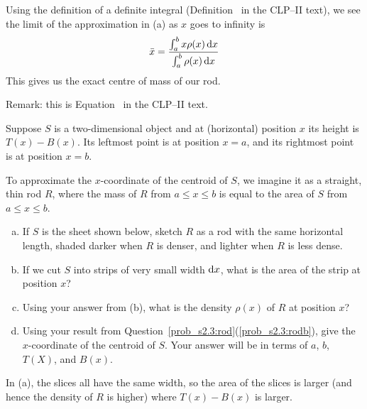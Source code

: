 \begin{solution}
\begin{enumerate}[(a)]
Using the definition of a definite integral (Definition~ in the CLP--II text), we see the limit of the approximation in (a) as $x$ goes to infinity is
\[\bar x=\frac{\int_a^b x\rho(x)\,\mathrm{d}x}{\int_a^b\rho(x)\,\mathrm{d}x}\]
This gives us the exact centre of mass of our rod.

Remark: this is Equation~ in the CLP--II text.
\end{enumerate}
\end{solution}
\begin{question}\label{prob_s2.3:xbar}
Suppose  $S$ is a two-dimensional object
and at (horizontal) position $x$  its height is $T(x)-B(x)$. Its leftmost point is at position $x=a$, and its rightmost point is at position $x=b$.

To approximate the $x$-coordinate of the centroid of $S$, we imagine it as a straight, thin rod $R$, where the mass of $R$ from $a \le x \le b$ is equal to the area of $S$ from $a \leq x \leq b$.
\begin{enumerate}[(a)]
\item If $S$ is the sheet shown below, sketch $R$ as a rod with the same horizontal length, shaded darker when $R$ is denser, and lighter when $R$ is less dense.
\begin{center}
\end{center}
\item If we cut $S$ into strips of very small width $\mathrm{d}x$, what is the  area of the strip at position $x$?
\item Using your answer from (b), what is the  density $\rho(x)$ of $R$ at position $x$?
\item Using your result from Question~\ref{prob_s2.3:rod}(\ref{prob_s2.3:rodb}), give the $x$-coordinate of the centroid of $S$. Your answer will be in terms of $a$, $b$, $T(X)$, and $B(x)$.
\end{enumerate}
\end{question}
\begin{hint}
In (a), the slices all have the same width, so the area of the slices is larger (and hence the density of $R$ is higher) where $T(x)-B(x)$ is larger.
\end{hint}
